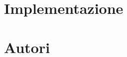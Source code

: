 \documentclass{llncs}
\newcommand{\version}{7}
\newcommand{\labelsec}[1]{\label{sec:#1}}
\begin{document}
\section{Implementazione}
\labelsec{Implementation}

%
%
%
\newpage
\section{Autori}
\labelsec{Authors}
\end{document}
